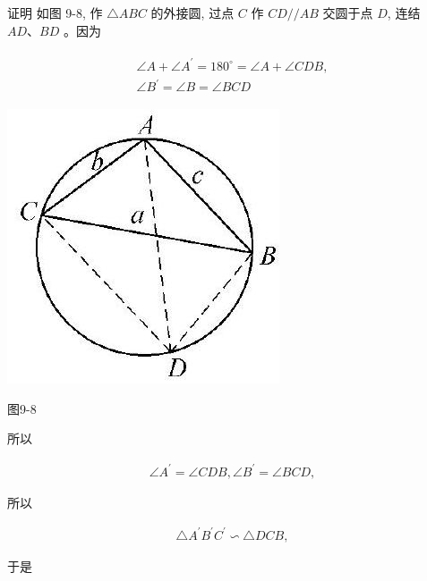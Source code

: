 \documentclass[10pt]{article}
\begin{document}
证明 如图 9-8, 作 $\triangle A B C$ 的外接圆, 过点 $C$ 作 $C D / / A B$ 交圆于点 $D$, 连结 $A D 、 B D$ 。因为

\begin{align*}
\begin{gathered}
\angle A+\angle A^{\prime}=180^{\circ}=\angle A+\angle C D B, \\
\angle B^{\prime}=\angle B=\angle B C D
\end{gathered}
\end{align*}

\begin{center}
\includegraphics[max width=\textwidth]{2024_10_30_66b8e5e701da2093c133g-068}
\end{center}

图9-8

所以

\begin{align*}
\angle A^{\prime}=\angle C D B, \angle B^{\prime}=\angle B C D,
\end{align*}

所以

\begin{align*}
\triangle A^{\prime} B^{\prime} C^{\prime} \backsim \triangle D C B,
\end{align*}

于是
\end{document}
